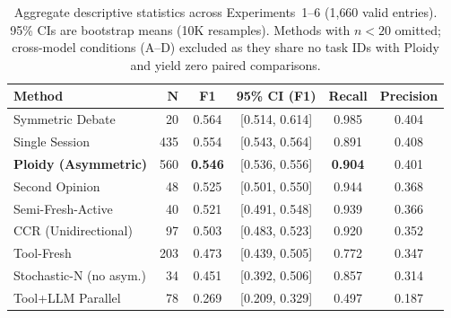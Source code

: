 \documentclass[11pt]{article}
\begin{document}
\begin{table}[t]
\centering
\caption{Aggregate descriptive statistics across Experiments~1--6 (1{,}660 valid entries). 95\% CIs are bootstrap means (10K resamples). Methods with $n<20$ omitted; cross-model conditions (A--D) excluded as they share no task IDs with Ploidy and yield zero paired comparisons.}
\label{tab:agg-descriptive}
\small
\begin{tabular}{@{}lrcccc@{}}
\toprule
\textbf{Method} & $\mathbf{N}$ & \textbf{F1} & \textbf{95\% CI (F1)} & \textbf{Recall} & \textbf{Precision} \\
\midrule
Symmetric Debate          & 20  & 0.564 & [0.514, 0.614] & 0.985 & 0.404 \\
Single Session            & 435 & 0.554 & [0.543, 0.564] & 0.891 & 0.408 \\
\textbf{Ploidy (Asymmetric)} & 560 & \textbf{0.546} & [0.536, 0.556] & \textbf{0.904} & 0.401 \\
Second Opinion            & 48  & 0.525 & [0.501, 0.550] & 0.944 & 0.368 \\
Semi-Fresh-Active         & 40  & 0.521 & [0.491, 0.548] & 0.939 & 0.366 \\
CCR (Unidirectional)      & 97  & 0.503 & [0.483, 0.523] & 0.920 & 0.352 \\
Tool-Fresh                & 203 & 0.473 & [0.439, 0.505] & 0.772 & 0.347 \\
Stochastic-N (no asym.)   & 34  & 0.451 & [0.392, 0.506] & 0.857 & 0.314 \\
Tool+LLM Parallel         & 78  & 0.269 & [0.209, 0.329] & 0.497 & 0.187 \\
\bottomrule
\end{tabular}
\end{table}
\end{document}
